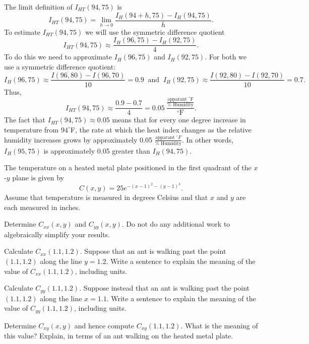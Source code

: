 \begin{exercises}
\begin{exerciseSolution}
	\item The limit definition of $I_{HT}(94,75)$ is
\[I_{HT}(94,75) = \lim_{h \to 0} \frac{I_H(94+h,75)-I_H(94,75)}{h}.\]
To estimate  $I_{HT}(94,75)$ we will use the symmetric difference quotient 
\[I_{HT}(94,75) \approx \frac{I_H(96,75) - I_H(92,75)}{4}.\]
To do this we need to approximate $I_H(96,75)$ and $I_H(92,75)$. For both we use a symmetric difference quotient:
\[I_H(96,75) \approx \frac{I(96,80)-I(96,70)}{10} = 0.9 \ \text{ and } \ I_H(92,75) \approx \frac{I(92,80)-I(92,70)}{10} = 0.7.\]
Thus,
\[I_{HT}(94,75) \approx \frac{0.9 - 0.7}{4} = 0.05 \ \frac{\frac{\text{apparant }^{\circ}\text{F}}{\% \text{ Humidity}} }{^{\circ}\text{F}}.\]
The fact that $I_{HT}(94,75) \approx 0.05$ means that for every one degree increase in temperature from $94^{\circ}$F, the rate at which the heat index changes as the relative humidity increases grows by approximately 0.05 $\frac{\text{apparant }^{\circ}F}{\% \text{ Humidity}}$.   In other words, $I_{H}(95,75)$ is approximately 0.05 greater than $I_{H}(94,75)$. 
	
   \ea
\end{exerciseSolution}


\item \label{Ez:10.3.2}   The temperature on a heated metal plate positioned in the first quadrant of the $x$-$y$ plane is given by 
$$C(x,y) = 25e^{-(x-1)^2 - (y-1)^3}.$$
Assume that temperature is measured in degrees Celsius and that $x$ and $y$ are each measured in inches. 
\ba

	\item Determine $C_{xx}(x,y)$ and $C_{yy}(x,y)$.  Do not do any additional work to algebraically simplify your results.

	\item Calculate $C_{xx}(1.1, 1.2)$.  Suppose that an ant is walking past the point $(1.1, 1.2)$ along the line $y = 1.2$.  Write a sentence to explain the meaning of the value of $C_{xx}(1.1, 1.2)$, including units.  

	\item Calculate $C_{yy}(1.1, 1.2)$.  Suppose instead that an ant is walking past the point $(1.1, 1.2)$ along the line $x = 1.1$.  Write a sentence to explain the meaning of the value of $C_{yy}(1.1, 1.2)$, including units.
	
	\item Determine $C_{xy}(x,y)$ and hence compute $C_{xy}(1.1, 1.2)$.  What is the meaning of this value?  Explain, in terms of an ant walking on the heated metal plate.


\end{exercises}
